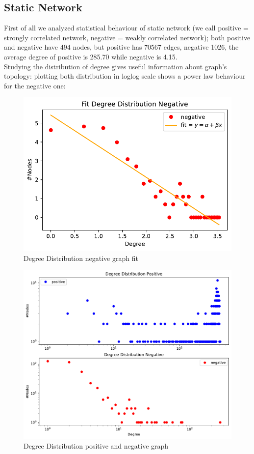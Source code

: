 \documentclass[sigchi]{acmart}
\begin{document}
\subsection{Static Network}
First of all we analyzed statistical behaviour of static network (we call positive = strongly correlated network, negative = weakly correlated network); both positive and negative have 494 nodes, but positive has 70567 edges, negative 1026, the average degree of positive is 285.70 while negative is 4.15. \\ Studying the distribution of degree gives useful information about graph's topology: plotting both distribution in loglog scale shows a power law behaviour for the negative one:
\begin{figure}[h]
	\centering
	\includegraphics[width=\linewidth]{plot/degree_distribution_negative_fit.pdf}
	\caption{Degree Distribution negative graph fit}
\end{figure}
\begin{figure}[h]
	\centering
	\includegraphics[width=\linewidth]{plot/degree_distribution.pdf}
	\caption{Degree Distribution positive and negative graph}
\end{figure}
\end{document}

